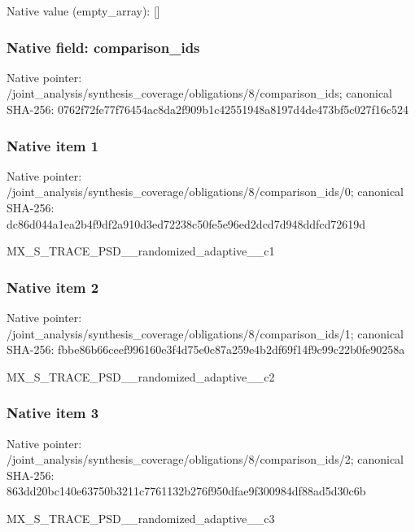 \documentclass[10pt,a4paper]{article}
\begin{document}
Native value (empty\_\allowbreak{}array): []

\subsubsection{Native field: comparison\_\allowbreak{}ids}
Native pointer: /joint\_\allowbreak{}analysis/synthesis\_\allowbreak{}coverage/obligations/8/comparison\_\allowbreak{}ids; canonical SHA-256: 0762f72fe77f76454ac8da2f909b1c42551948a8197d4de473bf5c027f16c524

\subsubsection{Native item 1}
Native pointer: /joint\_\allowbreak{}analysis/synthesis\_\allowbreak{}coverage/obligations/8/comparison\_\allowbreak{}ids/0; canonical SHA-256: dc86d044a1ea2b4f9df2a910d3ed72238c50fe5e96ed2dcd7d948ddfcd72619d

\begingroup\raggedright\sloppy MX\_\allowbreak{}S\_\allowbreak{}TRACE\_\allowbreak{}PSD\_\allowbreak{}\_\allowbreak{}randomized\_\allowbreak{}adaptive\_\allowbreak{}\_\allowbreak{}c1\par\endgroup

\subsubsection{Native item 2}
Native pointer: /joint\_\allowbreak{}analysis/synthesis\_\allowbreak{}coverage/obligations/8/comparison\_\allowbreak{}ids/1; canonical SHA-256: fbbe86b66ceef996160e3f4d75e0c87a259e4b2df69f14f9c99c22b0fe90258a

\begingroup\raggedright\sloppy MX\_\allowbreak{}S\_\allowbreak{}TRACE\_\allowbreak{}PSD\_\allowbreak{}\_\allowbreak{}randomized\_\allowbreak{}adaptive\_\allowbreak{}\_\allowbreak{}c2\par\endgroup

\subsubsection{Native item 3}
Native pointer: /joint\_\allowbreak{}analysis/synthesis\_\allowbreak{}coverage/obligations/8/comparison\_\allowbreak{}ids/2; canonical SHA-256: 863dd20bc140e63750b3211c7761132b276f950dfae9f300984df88ad5d30c6b

\begingroup\raggedright\sloppy MX\_\allowbreak{}S\_\allowbreak{}TRACE\_\allowbreak{}PSD\_\allowbreak{}\_\allowbreak{}randomized\_\allowbreak{}adaptive\_\allowbreak{}\_\allowbreak{}c3\par\endgroup
\end{document}
